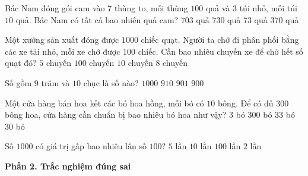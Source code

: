 \begin{ex} %
Bác Nam đóng gói cam vào $7$ thùng to, mỗi thùng $100$ quả và $3$ túi nhỏ, mỗi túi $10$ quả. Bác Nam có tất cả bao nhiêu quả cam?
\choice
{$703$ quả}
{\True $730$ quả}
{$73$ quả}
{$370$ quả}
\end{ex}

\begin{ex} %
Một xưởng sản xuất đóng được $1 000$ chiếc quạt. Người ta chở đi phân phối bằng các xe tải nhỏ, mỗi xe chở được $100$ chiếc. Cần bao nhiêu chuyến xe để chở hết số quạt đó?
\choice
{$5$ chuyến}
{$100$ chuyến}
{\True $10$ chuyến}
{$8$ chuyến}
\end{ex}

\begin{ex} %
Số gồm $9$ trăm và $10$ chục là số nào?
\choice
{\True $1 000$}
{$910$}
{$901$}
{$900$}
\end{ex}

\begin{ex} %
Một cửa hàng bán hoa kết các bó hoa hồng, mỗi bó có $10$ bông. Để có đủ $300$ bông hoa, cửa hàng cần chuẩn bị bao nhiêu bó hoa như vậy?
\choice
{$3$ bó}
{$300$ bó}
{$33$ bó}
{\True $30$ bó}
\end{ex}

\begin{ex} %
Số $1 000$ có giá trị gấp bao nhiêu lần số $100$?
\choice
{$5$ lần}
{\True $10$ lần}
{$100$ lần}
{$2$ lần}
\end{ex}

\textbf{Phần 2. Trắc nghiệm đúng sai}

